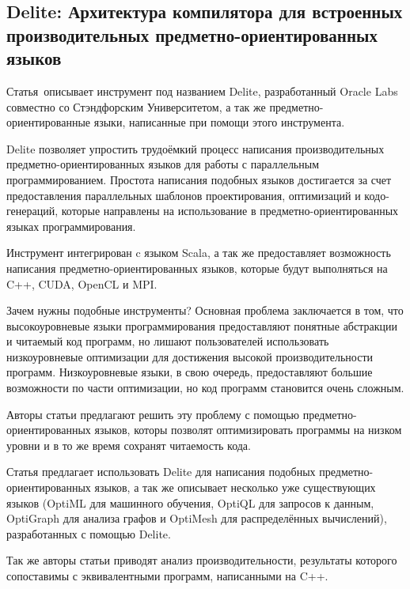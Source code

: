 \subsection{Delite: Архитектура компилятора для встроенных производительных предметно-ориентированных языков} \label{subsection_Sujeeth2014}
Статья\,\cite{Sujeeth2014} описывает инструмент под названием Delite, разработанный Oracle Labs совместно со Стэндфорским Университетом, а так же предметно-ориентированные языки, написанные при помощи этого инструмента.

Delite позволяет упростить трудоёмкий процесс написания производительных предметно-ориентированных языков для работы с параллельным программированием. Простота написания подобных языков достигается за счет предоставления параллельных шаблонов проектирования, оптимизаций и кодо-генераций, которые направлены на использование в предметно-ориентированных языках программирования.

Инструмент интегрирован c языком Scala, а так же предоставляет возможность написания предметно-ориентированных языков, которые будут выполняться на C++, CUDA, OpenCL и MPI.

Зачем нужны подобные инструменты? Основная проблема заключается в том, что высокоуровневые языки программирования предоставляют понятные абстракции и читаемый код программ, но лишают пользователей использовать низкоуровневые оптимизации для достижения высокой производительности программ. Низкоуровневые языки, в свою очередь, предоставляют большие возможности по части оптимизации, но код программ становится очень сложным. 

Авторы статьи предлагают решить эту проблему с помощью предметно-ориентированных языков, которы позволят оптимизировать программы на низком уровни и в то же время сохранят читаемость кода.

Статья предлагает использовать Delite для написания подобных предметно-ориентированных языков, а так же описывает несколько уже существующих языков (OptiML для машинного обучения, OptiQL для запросов к данным, OptiGraph для анализа графов и OptiMesh для распределённых вычислений), разработанных с помощью Delite. 

Так же авторы статьи приводят анализ производительности, результаты которого сопоставимы с эквивалентными программ, написанными на C++.





\todo{}